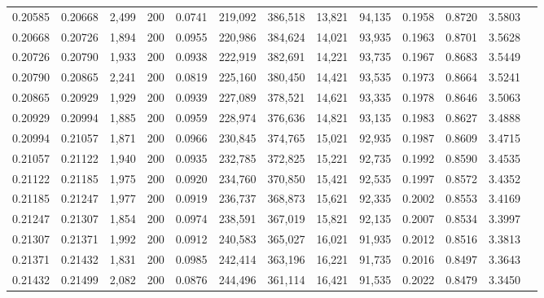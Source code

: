 \begin{tabular}{rrrrrrrrrrrrr}
0.20585 & 0.20668 & 2,499 & 200 &                                     0.0741 & 219,092 & 386,518 &  13,821 &  94,135 & 0.1958 & 0.8720 & 3.5803 \\
0.20668 & 0.20726 & 1,894 & 200 &                                     0.0955 & 220,986 & 384,624 &  14,021 &  93,935 & 0.1963 & 0.8701 & 3.5628 \\
0.20726 & 0.20790 & 1,933 & 200 &                                     0.0938 & 222,919 & 382,691 &  14,221 &  93,735 & 0.1967 & 0.8683 & 3.5449 \\
0.20790 & 0.20865 & 2,241 & 200 &                                     0.0819 & 225,160 & 380,450 &  14,421 &  93,535 & 0.1973 & 0.8664 & 3.5241 \\
0.20865 & 0.20929 & 1,929 & 200 &                                     0.0939 & 227,089 & 378,521 &  14,621 &  93,335 & 0.1978 & 0.8646 & 3.5063 \\
0.20929 & 0.20994 & 1,885 & 200 &                                     0.0959 & 228,974 & 376,636 &  14,821 &  93,135 & 0.1983 & 0.8627 & 3.4888 \\
0.20994 & 0.21057 & 1,871 & 200 &                                     0.0966 & 230,845 & 374,765 &  15,021 &  92,935 & 0.1987 & 0.8609 & 3.4715 \\
0.21057 & 0.21122 & 1,940 & 200 &                                     0.0935 & 232,785 & 372,825 &  15,221 &  92,735 & 0.1992 & 0.8590 & 3.4535 \\
0.21122 & 0.21185 & 1,975 & 200 &                                     0.0920 & 234,760 & 370,850 &  15,421 &  92,535 & 0.1997 & 0.8572 & 3.4352 \\
0.21185 & 0.21247 & 1,977 & 200 &                                     0.0919 & 236,737 & 368,873 &  15,621 &  92,335 & 0.2002 & 0.8553 & 3.4169 \\
0.21247 & 0.21307 & 1,854 & 200 &                                     0.0974 & 238,591 & 367,019 &  15,821 &  92,135 & 0.2007 & 0.8534 & 3.3997 \\
0.21307 & 0.21371 & 1,992 & 200 &                                     0.0912 & 240,583 & 365,027 &  16,021 &  91,935 & 0.2012 & 0.8516 & 3.3813 \\
0.21371 & 0.21432 & 1,831 & 200 &                                     0.0985 & 242,414 & 363,196 &  16,221 &  91,735 & 0.2016 & 0.8497 & 3.3643 \\
0.21432 & 0.21499 & 2,082 & 200 &                                     0.0876 & 244,496 & 361,114 &  16,421 &  91,535 & 0.2022 & 0.8479 & 3.3450 \\

\end{tabular}
